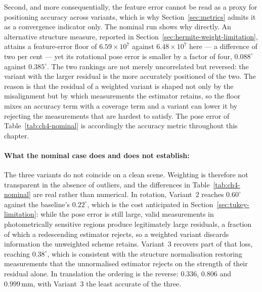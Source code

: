 Second, and more consequentially, the feature error cannot be read as a proxy
for positioning accuracy across variants, which is why
Section~\ref{sec:metrics} admits it as a convergence indicator only. The
nominal run shows why directly. An alternative structure measure, reported in
Section~\ref{sec:hermite-weight-limitation}, attains a feature-error floor of
$6.59\times10^{7}$ against $6.48\times10^{7}$ here --- a difference of two per
cent --- yet its rotational pose error is smaller by a factor of four,
$0.088^{\circ}$ against $0.385^{\circ}$. The two rankings are not merely
uncorrelated but reversed: the variant with the larger residual is the more
accurately positioned of the two. The reason is that the residual of a weighted
variant is shaped not only by the misalignment but by which measurements the
estimator retains, so the floor mixes an accuracy term with a coverage term and
a variant can lower it by rejecting the measurements that are hardest to
satisfy. The pose error of Table~\ref{tab:ch4-nominal} is accordingly the
accuracy metric throughout this chapter.

\paragraph{What the nominal case does and does not establish:}
The three variants do not coincide on a clean scene. Weighting is therefore not
transparent in the absence of outliers, and the differences in
Table~\ref{tab:ch4-nominal} are real rather than numerical. In rotation,
Variant~2 reaches $0.60^{\circ}$ against the baseline's $0.22^{\circ}$, which
is the cost anticipated in Section~\ref{sec:tukey-limitation}: while the pose
error is still large, valid measurements in photometrically sensitive regions
produce legitimately large residuals, a fraction of which a redescending
estimator rejects, so a weighted variant discards information the unweighted
scheme retains. Variant~3 recovers part of that loss, reaching $0.38^{\circ}$,
which is consistent with the structure normalisation restoring measurements
that the unnormalised estimator rejects on the strength of their residual
alone. In translation the ordering is the reverse: $0.336$, $0.806$ and
$0.999\,\mathrm{mm}$, with Variant~3 the least accurate of the three.

